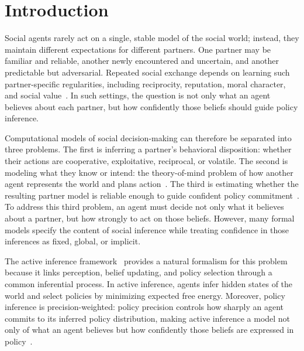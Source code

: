 \section{Introduction}

Social agents rarely act on a single, stable model of the social world; instead, they maintain different expectations for different partners. One partner may be familiar and reliable, another newly encountered and uncertain, and another predictable but adversarial. Repeated social exchange depends on learning such partner-specific regularities, including reciprocity, reputation, moral character, and social value~\cite{Behrens2008SocialLearning,Delgado2005MoralCharacter,KingCasas2005Trust}. In such settings, the question is not only what an agent believes about each partner, but how confidently those beliefs should guide policy inference.

Computational models of social decision-making can therefore be separated into three problems. The first is inferring a partner's behavioral disposition: whether their actions are cooperative, exploitative, reciprocal, or volatile. The second is modeling what they know or intend: the theory-of-mind problem of how another agent represents the world and plans action~\cite{FrithFrith2012,Hampton2008Mentalizing,Pitliya2025ToMActiveInference}. The third is estimating whether the resulting partner model is reliable enough to guide confident policy commitment~\cite{Schoeller2021TrustExtendedControl}. To address this third problem, an agent must decide not only what it believes about a partner, but how strongly to act on those beliefs. However, many formal models specify the content of social inference while treating confidence in those inferences as fixed, global, or implicit.

The active inference framework~\cite{Parr2022ActiveInference} provides a natural formalism for this problem because it links perception, belief updating, and policy selection through a common inferential process. In active inference, agents infer hidden states of the world and select policies by minimizing expected free energy. Moreover, policy inference is precision-weighted: policy precision controls how sharply an agent commits to its inferred policy distribution, making active inference a model not only of what an agent believes but how confidently those beliefs are expressed in policy~\cite{Friston2017ProcessTheory}.

